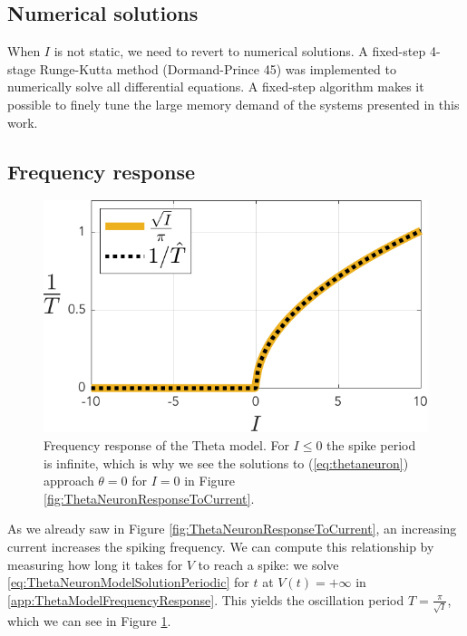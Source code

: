 \subsection{Numerical solutions} \label{sec:TheThetaNeuronModelODE45}
When $I$ is not static, we need to revert to numerical solutions. A fixed-step 4-stage Runge-Kutta method (Dormand-Prince 45) was implemented to numerically solve all differential equations. A fixed-step algorithm makes it possible to finely tune the large memory demand of the systems presented in this work. 


\subsection{Frequency response} \label{sec:TheThetaNeuronModelFrequencyResponse}
\setlength\intextsep{0pt}
\begin{figure}
\centering
\includegraphics[width = \linewidth]{../Figures/ThetaNeuronfI.pdf}
\caption{Frequency response of the Theta model. For $I \leq 0$ the spike period is infinite, which is why we see the solutions to (\ref{eq:thetaneuron}) approach $\theta = 0$ for $I = 0$ in Figure \ref{fig:ThetaNeuronResponseToCurrent}. }
\label{fig:ThetaNeuronfI}
\end{figure}
As we already saw in Figure \ref{fig:ThetaNeuronResponseToCurrent}, an increasing current increases the spiking frequency. We can compute this relationship by measuring how long it takes for $V$ to reach a spike: we solve \eqref{eq:ThetaNeuronModelSolutionPeriodic} for $t$ at $V(t) = +\infty$ in \ref{app:ThetaModelFrequencyResponse}. This yields the oscillation period $T = \frac{\pi}{\sqrt{I}}$, which we can see in Figure \ref{fig:ThetaNeuronfI}. 


